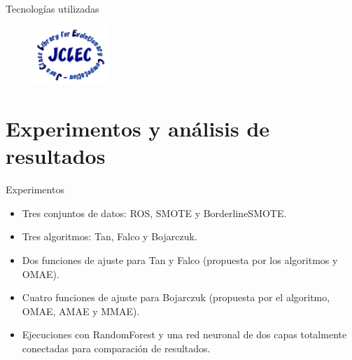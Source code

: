 \documentclass{beamer}
\begin{document}
\begin{frame}{Tecnologías utilizadas}

	\begin{table}[H]
	\centering
	\end{table}
	\begin{figure}[H]
		 \centering
		 \includegraphics[width=0.25\textwidth]{logos/jclec.png}
	\end{figure}


\end{frame}


\section{Experimentos y análisis de resultados}

\begin{frame}{Experimentos}

	\begin{itemize}
		\item Tres conjuntos de datos: ROS, SMOTE y BorderlineSMOTE.
		\item Tres algoritmos: Tan, Falco y Bojarczuk.
		\item Dos funciones de ajuste para Tan y Falco (propuesta por los algoritmos y OMAE).
		\item Cuatro funciones de ajuste para Bojarczuk (propuesta por el algoritmo, OMAE, AMAE y MMAE).
		\item Ejecuciones con RandomForest y una red neuronal de dos capas totalmente conectadas para comparación de resultados.
	\end{itemize}

\end{frame}
\end{document}
